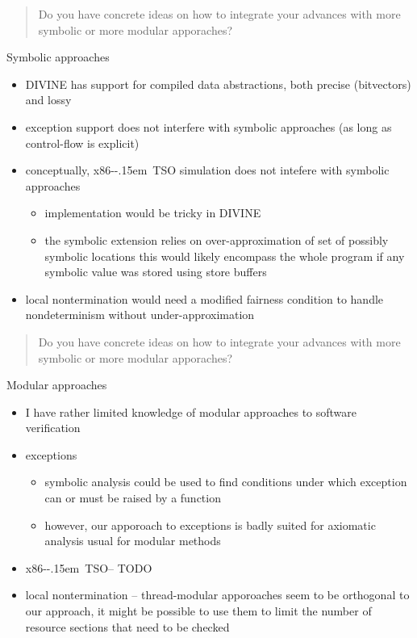 \documentclass[aspectratio=169, fi]{paradise-slide}
\newcommand{\xtso}{\mbox{x86-\kern-.15em TSO}\xspace}
\newcommand{\rquote}[1]{\begin{quote}#1\end{quote}\bigskip\setlength{\leftmargini}{1em}}
\begin{document}
\begin{frame}[noframenumbering]{\qtitle}
  \rquote{Do you have concrete ideas on how to integrate your advances with more symbolic or more
    modular apporaches?}

  Symbolic approaches
  \begin{itemize}
    \item DIVINE has support for compiled data abstractions, both precise (bitvectors) and lossy
    \item exception support does not interfere with symbolic approaches (as long as control-flow is
      explicit)
    \item conceptually, \xtso simulation does not intefere with symbolic approaches
      \begin{itemize}
        \item implementation would be tricky in DIVINE
        \item the symbolic extension relies on over-approximation of set of possibly symbolic
          locations this would likely encompass the whole program if any symbolic value was stored
          using store buffers
      \end{itemize}
    \item local nontermination would need a modified fairness condition to handle nondeterminism
      without under-approximation
  \end{itemize}
\end{frame}

\begin{frame}[noframenumbering]{\qtitle}
  \rquote{Do you have concrete ideas on how to integrate your advances with more symbolic or more
    modular apporaches?}

  Modular approaches
  \begin{itemize}
    \item I have rather limited knowledge of modular approaches to software verification
    \item exceptions
      \begin{itemize}
        \item symbolic analysis could be used to find conditions under which exception can
          or must be raised by a function
        \item however, our apporoach to exceptions is badly suited for axiomatic analysis usual for
          modular methods
      \end{itemize}
    \item \xtso – TODO
    \item local nontermination – thread-modular apporoaches seem to be orthogonal to our approach,
      it might be possible to use them to limit the number of resource sections that need to be
      checked
  \end{itemize}
\end{frame}
\end{document}
